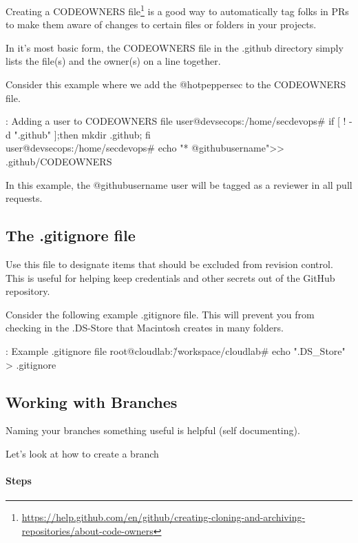 \justify
Creating a CODEOWNERS file\footnote{\url{https://help.github.com/en/github/creating-cloning-and-archiving-repositories/about-code-owners}}
is a good way to automatically tag folks in PRs to make them aware of
changes to certain files or folders in your projects.

\justify
In it's most basic form, the CODEOWNERS file in the .github directory
simply lists the file(s) and the owner(s) on a line together.

\justify
Consider this example where we add the @hotpeppersec to the CODEOWNERS
file.

\begin{mybox}{\thetcbcounter: Adding a user to CODEOWNERS file}
user@devsecops:/home/secdevops\# if [ ! -d ".github" ];then mkdir .github; fi\\
user@devsecops:/home/secdevops\# echo "* @githubusername">> .github/CODEOWNERS
\end{mybox}

In this example, the @githubusername user will be tagged as a reviewer
in all pull requests.


\subsection{The .gitignore file}
\justify
Use this file to designate items that should be excluded from revision
control. This is useful for helping keep credentials and other secrets
out of the GitHub repository.

\justify
Consider the following example .gitignore file. This will prevent you
from checking in the .DS-Store that Macintosh creates in many folders.

\begin{mybox}{\thetcbcounter: Example .gitignore file}
root@cloudlab:\~/workspace/cloudlab\# echo ".DS\_Store" > .gitignore
\end{mybox}

\subsection{Working with Branches}

Naming your branches something useful is helpful (self documenting).

Let's look at how to create a branch

\hypertarget{steps-3}{%
\paragraph{Steps}\label{steps-3}}


